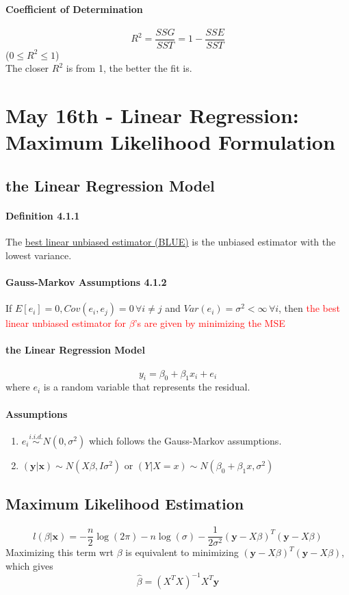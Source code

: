\documentclass[11pt]{article}
\newcommand{\tb}[1]{\textbf{#1}}
\newcommand{\under}[1]{\underline{#1}}
\newcommand{\vx}[0]{\tb{x}}
\newcommand{\vy}[0]{\tb{y}}
\begin{document}
\paragraph{Coefficient of Determination}
$$R^2 = \frac{SSG}{SST} = 1- \frac{SSE}{SST}$$
($0 \leq R^2 \leq 1$)\\
The closer $R^2$ is from 1, the better the fit is.
\section{May 16th - Linear Regression: Maximum Likelihood Formulation}
\subsection{the Linear Regression Model}
\paragraph{Definition 4.1.1}
The \under{best linear unbiased estimator (BLUE)} is the unbiased estimator with the lowest variance.
\paragraph{Gauss-Markov Assumptions 4.1.2}
If $E[e_i] = 0, Cov(e_i, e_j) = 0 \, \forall i \neq j$ and $Var(e_i) = \sigma^2 < \infty \, \forall i$, then \textcolor{red}{the best linear unbiased estimator for $\beta$'s are given by minimizing the MSE}
\paragraph{the Linear Regression Model}
$$y_i = \beta_0 + \beta_1x_i + e_i$$
where $e_i$ is a random variable that represents the residual. \\
\paragraph{Assumptions}
\begin{enumerate}
    \item $e_i \overset{i.i.d.}{\sim} N(0, \sigma^2)$ which follows the Gauss-Markov assumptions. 
    \item $(\vy|\vx) \sim N(X\beta, I\sigma^2)$ or $(Y|X = x) \sim N(\beta_0 + \beta_1x, \sigma^2)$
\end{enumerate}
\subsection{Maximum Likelihood Estimation}
$$l(\beta | \vx) = -\frac{n}{2}\log(2\pi) - n\log(\sigma) - \frac{1}{2\sigma^2} (\vy - X \beta)^T(\vy - X\beta)$$
Maximizing this term wrt $\beta$ is equivalent to minimizing $(\vy - X\beta)^T(\vy-X\beta)$, which gives $$\hat{\beta} = (X^TX)^{-1}X^T\vy$$
\end{document}
